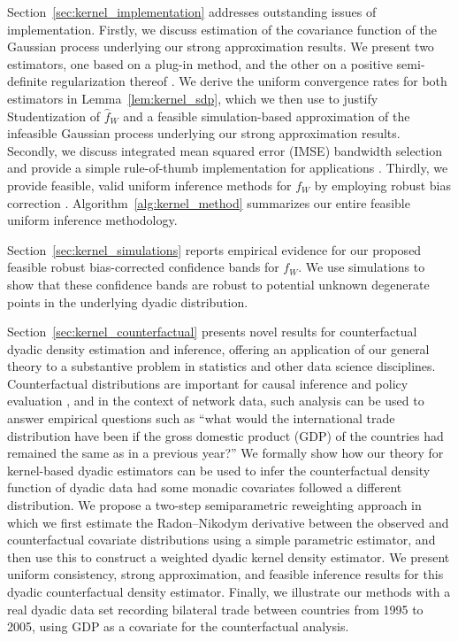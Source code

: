 Section~\ref{sec:kernel_implementation} addresses outstanding issues of
implementation. Firstly, we discuss estimation of the covariance function of
the Gaussian process underlying our strong approximation results. We present
two estimators, one based on a plug-in method, and the other on a
positive semi-definite regularization thereof \citep{laurent2005semidefinite}.
We derive the uniform convergence rates for both estimators in
Lemma~\ref{lem:kernel_sdp}, which we then use to justify Studentization
of $\hat{f}_W$
and a feasible simulation-based approximation of the infeasible Gaussian
process underlying our strong approximation results. Secondly, we discuss
integrated mean squared error (IMSE) bandwidth selection and provide a simple
rule-of-thumb implementation for applications
\citep{wand1994kernel,simonoff1996smoothing}. Thirdly, we provide feasible,
valid uniform inference methods for $f_W$ by employing robust bias correction
\citep{calonico2018effect, calonico2022coverage}.
Algorithm~\ref{alg:kernel_method}
summarizes our entire feasible uniform inference methodology.

Section~\ref{sec:kernel_simulations} reports empirical evidence for our proposed
feasible robust bias-corrected confidence bands for $f_W$. We use simulations
to show that these confidence bands are robust to potential unknown degenerate
points in the underlying dyadic distribution.

Section~\ref{sec:kernel_counterfactual} presents novel results for
counterfactual
dyadic density estimation and inference, offering an application of our general
theory to a substantive problem in statistics and other data science
disciplines. Counterfactual distributions are important for causal inference
and policy evaluation
\citep{dinardo1996distribution,chernozhukov2013inference}, and in the context
of network data, such analysis can be used to answer empirical questions such
as ``what would the international trade distribution have been if
the gross domestic product (GDP) of the countries had remained the same as in a
previous year?'' We formally show how our theory for kernel-based dyadic
estimators can be used to infer the counterfactual density function of dyadic
data had some monadic covariates followed a different distribution. We propose
a two-step semiparametric reweighting approach in which we first estimate the
Radon--Nikodym derivative between the observed and counterfactual covariate
distributions using a simple parametric estimator, and then use this to
construct a weighted dyadic kernel density estimator. We present uniform
consistency, strong approximation, and feasible inference results for this
dyadic counterfactual density estimator. Finally, we illustrate our
methods with a real dyadic data set recording bilateral trade between
countries from 1995 to 2005, using GDP as a covariate for the
counterfactual analysis.

